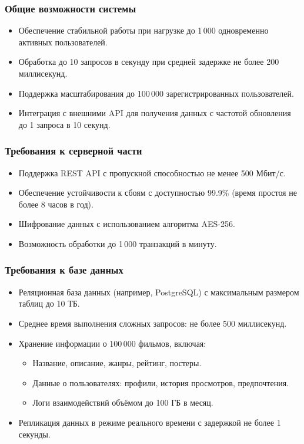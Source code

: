 \subsubsection*{Общие возможности системы}
\begin{itemize}
	\item Обеспечение стабильной работы при нагрузке до 1\,000 одновременно активных пользователей.
	\item Обработка до 10 запросов в секунду при средней задержке не более 200 миллисекунд.
	\item Поддержка масштабирования до 100\,000 зарегистрированных пользователей.
	\item Интеграция с внешними API для получения данных с частотой обновления до 1 запроса в 10 секунд.
\end{itemize}

\subsubsection*{Требования к серверной части}
\begin{itemize}
	\item Поддержка REST API с пропускной способностью не менее 500 Мбит/с.
	\item Обеспечение устойчивости к сбоям с доступностью 99.9\% (время простоя не более 8 часов в год).
	\item Шифрование данных с использованием алгоритма AES-256.
	\item Возможность обработки до 1\,000 транзакций в минуту.
\end{itemize}

\subsubsection*{Требования к базе данных}
\begin{itemize}
	\item Реляционная база данных (например, PostgreSQL) с максимальным размером таблиц до 10 ТБ.
	\item Среднее время выполнения сложных запросов: не более 500 миллисекунд.
	\item Хранение информации о 100\,000 фильмов, включая:
	\begin{itemize}
		\item Название, описание, жанры, рейтинг, постеры.
		\item Данные о пользователях: профили, история просмотров, предпочтения.
		\item Логи взаимодействий объёмом до 100 ГБ в месяц.
	\end{itemize}
	\item Репликация данных в режиме реального времени с задержкой не более 1 секунды.
\end{itemize}

